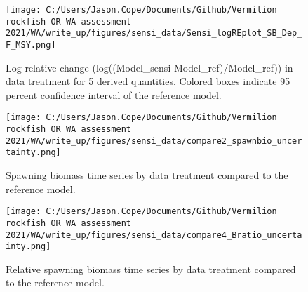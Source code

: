 \documentclass[11pt,
  english,
  a4paper,
]{article}
\begin{document}
\tagmcend\tagstructend


\begin{figure}
\centering
\texttt{[image: C:/Users/Jason.Cope/Documents/Github/Vermilion rockfish OR WA assessment 2021/WA/write\_up/figures/sensi\_data/Sensi\_logREplot\_SB\_Dep\_F\_MSY.png]}
\caption{Log relative change (log((Model\_sensi-Model\_ref)/Model\_ref)) in data treatment for 5 derived quantities. Colored boxes indicate 95 percent confidence interval of the reference model.\label{fig:sensi-modspec-RE}}
\end{figure}

\tagmcend\tagstructend


\begin{figure}
\centering
\texttt{[image: C:/Users/Jason.Cope/Documents/Github/Vermilion rockfish OR WA assessment 2021/WA/write\_up/figures/sensi\_data/compare2\_spawnbio\_uncertainty.png]}
\caption{Spawning biomass time series by data treatment compared to the reference model.\label{fig:sensi-modspec-ssb}}
\end{figure}

\tagmcend\tagstructend


\begin{figure}
\centering
\texttt{[image: C:/Users/Jason.Cope/Documents/Github/Vermilion rockfish OR WA assessment 2021/WA/write\_up/figures/sensi\_data/compare4\_Bratio\_uncertainty.png]}
\caption{Relative spawning biomass time series by data treatment compared to the reference model.\label{fig:sensi-modspec-depl}}
\end{figure}

\tagmcend\tagstructend

\end{document}
